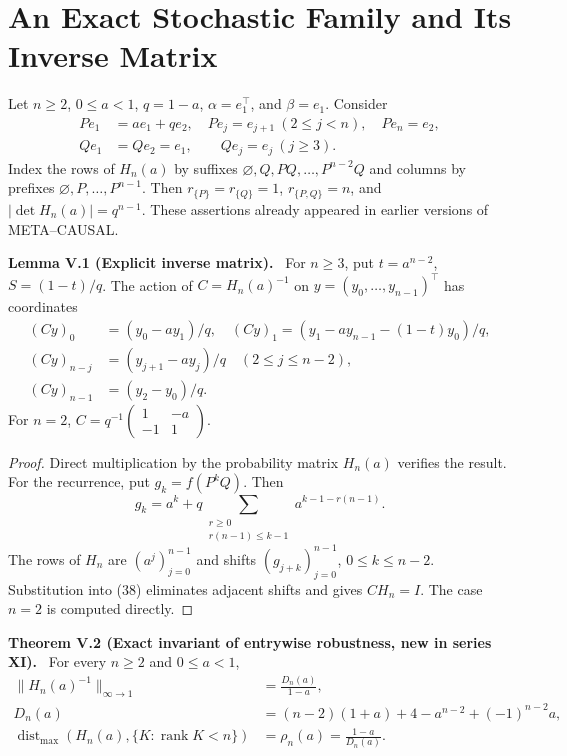 \documentclass[11pt,a4paper,oneside]{book}
\DeclareMathOperator{\rank}{rank}\DeclareMathOperator{\Tr}{Tr}
\newcommand{\statement}[3]{\par\medskip\noindent\textbf{#1 #2 (#3).}\ }
\begin{document}
\chapter{An Exact Stochastic Family and Its Inverse Matrix}
Let $n\ge2$, $0\le a<1$, $q=1-a$, $\alpha=e_1^\top$, and $\beta=e_1$. Consider
\begin{align}Pe_1&=ae_1+qe_2,\quad Pe_j=e_{j+1}\ (2\le j<n),\quad Pe_n=e_2,\tag{36}\\
Qe_1&=Qe_2=e_1,\qquad Qe_j=e_j\ (j\ge3).\tag{37}\end{align}
Index the rows of $H_n(a)$ by suffixes $\varnothing,Q,PQ,\ldots,P^{n-2}Q$ and columns by prefixes $\varnothing,P,\ldots,P^{n-1}$. Then $r_{\{P\}}=r_{\{Q\}}=1$, $r_{\{P,Q\}}=n$, and $|\det H_n(a)|=q^{n-1}$. These assertions already appeared in earlier versions of META--CAUSAL.
\statement{Lemma}{V.1}{Explicit inverse matrix} For $n\ge3$, put $t=a^{n-2}$, $S=(1-t)/q$. The action of $C=H_n(a)^{-1}$ on $y=(y_0,\ldots,y_{n-1})^\top$ has coordinates
\begin{align}(Cy)_0&=(y_0-ay_1)/q,\quad(Cy)_1=(y_1-ay_{n-1}-(1-t)y_0)/q,\tag{38}\\
(Cy)_{n-j}&=(y_{j+1}-ay_j)/q\quad(2\le j\le n-2),\tag{39}\\
(Cy)_{n-1}&=(y_2-y_0)/q.\tag{40}\end{align}
For $n=2$, $C=q^{-1}\left(\begin{smallmatrix}1&-a\\-1&1\end{smallmatrix}\right)$.
\begin{proof}Direct multiplication by the probability matrix $H_n(a)$ verifies the result. For the recurrence, put $g_k=f(P^kQ)$. Then
\[g_k=a^k+q\sum_{\substack{r\ge0\\r(n-1)\le k-1}}a^{k-1-r(n-1)}.\]
The rows of $H_n$ are $(a^j)_{j=0}^{n-1}$ and shifts $(g_{j+k})_{j=0}^{n-1}$, $0\le k\le n-2$. Substitution into (38) eliminates adjacent shifts and gives $CH_n=I$. The case $n=2$ is computed directly.\end{proof}
\statement{Theorem}{V.2}{Exact invariant of entrywise robustness, new in series XI} For every $n\ge2$ and $0\le a<1$,
\begin{align}\|H_n(a)^{-1}\|_{\infty\to1}&=\frac{D_n(a)}{1-a},\tag{41}\\
D_n(a)&=(n-2)(1+a)+4-a^{n-2}+(-1)^{n-2}a,\tag{42}\\
\operatorname{dist}_{\max}(H_n(a),\{K:\rank K<n\})&=\rho_n(a)=\frac{1-a}{D_n(a)}.\tag{43}\end{align}
\end{document}
